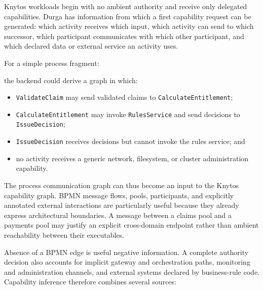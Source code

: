 Knytos workloads begin with no ambient authority and receive only delegated
capabilities. Durga has information from which a first capability request can be
generated: which activity receives which input, which activity can send to
which successor, which participant communicates with which other participant,
and which declared data or external service an activity uses.

For a simple process fragment:

\begin{center}
\end{center}

the backend could derive a graph in which:

\begin{itemize}
    \item \texttt{ValidateClaim} may send validated claims to
        \texttt{CalculateEntitlement};
    \item \texttt{CalculateEntitlement} may invoke
        \texttt{RulesService} and send decisions to
        \texttt{IssueDecision};
    \item \texttt{IssueDecision} receives decisions but cannot invoke the
        rules service; and
    \item no activity receives a generic network, filesystem, or cluster
        administration capability.
\end{itemize}

The process communication graph can thus become an input to the Knytos
capability graph. BPMN message flows, pools, participants, and explicitly
annotated external interactions are particularly useful because they already
express architectural boundaries. A message between a claims pool and a
payments pool may justify an explicit cross-domain endpoint rather than ambient
reachability between their executables.

Absence of a BPMN edge is useful negative information. A complete authority
decision also accounts for implicit gateway and orchestration paths, monitoring
and administration channels, and external systems declared by business-rule
code. Capability inference therefore combines several sources:

